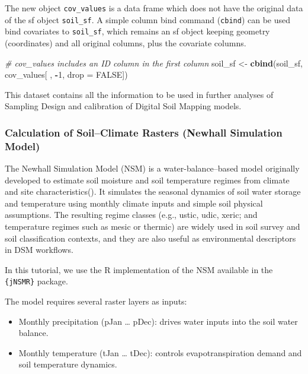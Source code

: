 \documentclass[
  10pt,
  b5paper,
  oneside]{book}
\newenvironment{Shaded}{\begin{snugshade}}{\end{snugshade}}
\newcommand{\AttributeTok}[1]{\textcolor[rgb]{0.13,0.29,0.53}{#1}}
\newcommand{\CommentTok}[1]{\textcolor[rgb]{0.56,0.35,0.01}{\textit{#1}}}
\newcommand{\ConstantTok}[1]{\textcolor[rgb]{0.56,0.35,0.01}{#1}}
\newcommand{\DecValTok}[1]{\textcolor[rgb]{0.00,0.00,0.81}{#1}}
\newcommand{\FunctionTok}[1]{\textcolor[rgb]{0.13,0.29,0.53}{\textbf{#1}}}
\newcommand{\NormalTok}[1]{#1}
\newcommand{\OtherTok}[1]{\textcolor[rgb]{0.56,0.35,0.01}{#1}}
\newcommand{\SpecialCharTok}[1]{\textcolor[rgb]{0.81,0.36,0.00}{\textbf{#1}}}
\begin{document}
The new object \texttt{cov\_values} is a data frame which does not have the original data of the sf object \texttt{soil\_sf}. A simple column bind command (\texttt{cbind}) can be used bind covariates to \texttt{soil\_sf}, which remains an sf object keeping geometry (coordinates) and all original columns, plus the covariate columns.

\begin{Shaded}
\begin{Highlighting}[]
\CommentTok{\# cov\_values includes an ID column in the first column}
\NormalTok{soil\_sf }\OtherTok{\textless{}{-}} \FunctionTok{cbind}\NormalTok{(soil\_sf, cov\_values[ , }\SpecialCharTok{{-}}\DecValTok{1}\NormalTok{, }\AttributeTok{drop =} \ConstantTok{FALSE}\NormalTok{])}
\end{Highlighting}
\end{Shaded}

This dataset contains all the information to be used in further analyses of Sampling Design and calibration of Digital Soil Mapping models.

\subsubsection{Calculation of Soil--Climate Rasters (Newhall Simulation Model)}\label{calculation-of-soilclimate-rasters-newhall-simulation-model}

The Newhall Simulation Model (NSM) is a water-balance--based model originally developed to estimate soil moisture and soil temperature regimes from climate and site characteristics(). It simulates the seasonal dynamics of soil water storage and temperature using monthly climate inputs and simple soil physical assumptions. The resulting regime classes (e.g., ustic, udic, xeric; and temperature regimes such as mesic or thermic) are widely used in soil survey and soil classification contexts, and they are also useful as environmental descriptors in DSM workflows.

In this tutorial, we use the R implementation of the NSM available in the \texttt{\{jNSMR\}} package.

The model requires several raster layers as inputs:

\begin{itemize}
\item
  Monthly precipitation (pJan \ldots{} pDec): drives water inputs into the soil water balance.
\item
  Monthly temperature (tJan \ldots{} tDec): controls evapotranspiration demand and soil temperature dynamics.
\end{itemize}
\end{document}
